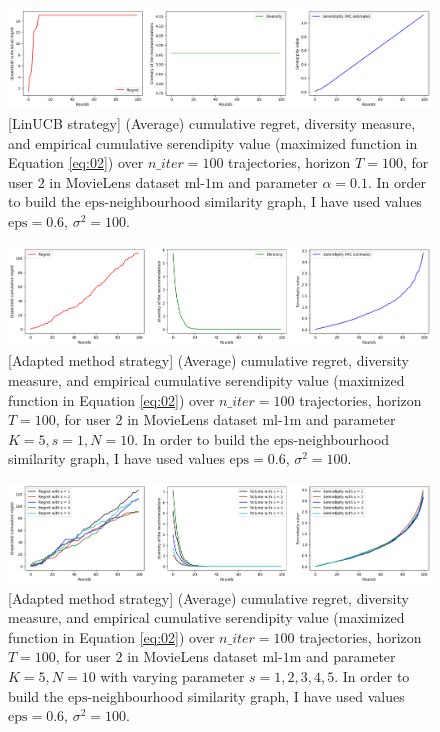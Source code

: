 \documentclass{article}
\begin{document}
\begin{figure}[H]
  \centering
  \includegraphics[scale=0.4]{../Results/ml-1m/linUCB-39sec.png}
  \caption{[LinUCB strategy] (Average) cumulative regret, diversity measure, and empirical cumulative serendipity value (maximized function in Equation \ref{eq:02}) over $n\_iter=100$ trajectories, horizon $T=100$, for user $2$ in MovieLens dataset $\text{ml-1m}$ and parameter $\alpha=0.1$. In order to build the $\text{eps}$-neighbourhood similarity graph, I have used values $\text{eps}=0.6$, $\sigma^{2}=100$.}
\label{figlinUCB}
\end{figure}

\begin{figure}[H]
  \centering
  \includegraphics[scale=0.4]{../Results/ml-1m/lagree-1min31sec.png}
  \caption{[Adapted method strategy] (Average) cumulative regret, diversity measure, and empirical cumulative serendipity value (maximized function in Equation \ref{eq:02}) over $n\_iter=100$ trajectories, horizon $T=100$, for user $2$ in MovieLens dataset $\text{ml-1m}$ and parameter $K=5, s=1, N=10$. In order to build the $\text{eps}$-neighbourhood similarity graph, I have used values $\text{eps}=0.6$, $\sigma^{2}=100$.}
\label{figlagree}
\end{figure}

\begin{figure}[H]
  \centering
  \includegraphics[scale=0.4]{../Results/ml-1m/lagree.png}
  \caption{[Adapted method strategy] (Average) cumulative regret, diversity measure, and empirical cumulative serendipity value (maximized function in Equation \ref{eq:02}) over $n\_iter=100$ trajectories, horizon $T=100$, for user $2$ in MovieLens dataset $\text{ml-1m}$ and parameter $K=5, N=10$ with varying parameter $s=1, 2, 3, 4, 5$. In order to build the $\text{eps}$-neighbourhood similarity graph, I have used values $\text{eps}=0.6$, $\sigma^{2}=100$.}
\label{figlagreecomp}
\end{figure}
\end{document}
